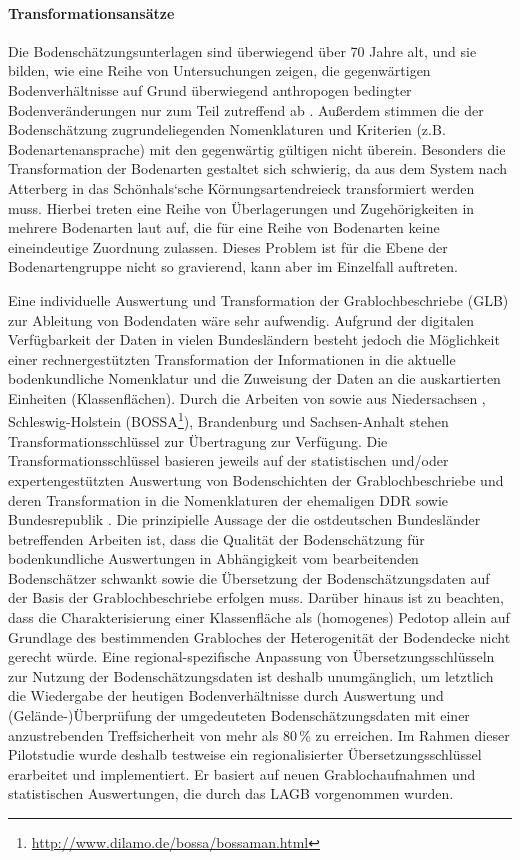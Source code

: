 \paragraph{Transformationsansätze}
Die Bodenschätzungsunterlagen sind überwiegend über 70 Jahre alt, und sie bilden, wie eine Reihe von Untersuchungen zeigen, die gegenwärtigen  Bodenverhältnisse auf Grund überwiegend anthropogen bedingter Bodenveränderungen nur zum Teil zutreffend ab \citep[vgl.][]{geoflux_Schmidt-etal2009mlu,MoellerVolk2015geoderma}. Außerdem stimmen die der Bodenschätzung zugrundeliegenden Nomenklaturen und Kriterien (z.B. Bodenartenansprache) mit den gegenwärtig gültigen nicht überein. Besonders die Transformation der Bodenarten gestaltet sich schwierig, da aus dem System nach Atterberg in das Schönhals‘sche Körnungsartendreieck transformiert werden muss. Hierbei treten eine Reihe von Überlagerungen und Zugehörigkeiten in mehrere Bodenarten laut \citet{KA5} auf, die für eine Reihe von Bodenarten keine eineindeutige Zuordnung zulassen. Dieses Problem ist für die Ebene der Bodenartengruppe nicht so gravierend, kann aber im Einzelfall  auftreten.\

Eine individuelle Auswertung und Transformation der Grablochbeschriebe (GLB) zur Ableitung von Bodendaten wäre sehr aufwendig. Aufgrund der digitalen Verfügbarkeit der Daten in vielen Bundesländern besteht jedoch die Möglichkeit einer rechnergestützten Transformation der Informationen in die aktuelle bodenkundliche Nomenklatur und die Zuweisung der Daten an die auskartierten Einheiten (Klassenflächen). Durch die Arbeiten von \citet{Wallbaum1991} sowie aus Niedersachsen \citep[NIBIS;][]{NBIS2003}, Schleswig-Holstein (BOSSA\footnote{\url{http://www.dilamo.de/bossa/bossaman.html}}), Brandenburg \citep{KuehnMueller2009} und Sachsen-Anhalt \citep{Altermann-etal2003} stehen Transformationsschlüssel zur Übertragung zur Verfügung. Die Transformationsschlüssel basieren jeweils auf der statistischen und/oder expertengestützten Auswertung von Bodenschichten der Grablochbeschriebe und deren Transformation in die Nomenklaturen der ehemaligen DDR sowie Bundesrepublik \citep{TGL24300,KA3,KA4}. Die prinzipielle Aussage der die ostdeutschen Bundesländer betreffenden Arbeiten ist, dass die Qualität der Bodenschätzung für bodenkundliche Auswertungen in Abhängigkeit vom bearbeitenden Bodenschätzer schwankt sowie die Übersetzung der Bodenschätzungsdaten auf der Basis der Grablochbeschriebe erfolgen muss. Darüber hinaus ist zu beachten, dass die Charakterisierung einer Klassenfläche als (homogenes) Pedotop allein auf Grundlage des bestimmenden Grabloches der Heterogenität der Bodendecke nicht gerecht würde. Eine regional-spezifische Anpassung von Übersetzungsschlüsseln zur Nutzung der Bodenschätzungsdaten ist deshalb unumgänglich, um letztlich die Wiedergabe der heutigen Bodenverhältnisse durch Auswertung und (Gelände-)Überprüfung der umgedeuteten Bodenschätzungsdaten mit einer anzustrebenden Treffsicherheit von mehr als 80\,\% zu erreichen.  Im Rahmen dieser Pilotstudie wurde deshalb testweise ein regionalisierter Übersetzungsschlüssel erarbeitet und implementiert. Er basiert  auf neuen Grablochaufnahmen und statistischen Auswertungen, die durch das LAGB vorgenommen wurden.



